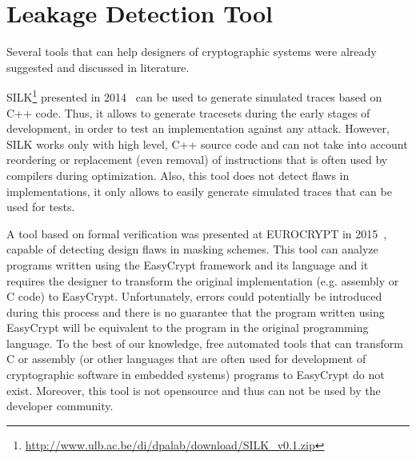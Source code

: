 \section{Leakage Detection Tool}\label{sec:tool}


Several tools that can help designers of cryptographic systems
were already suggested and discussed in literature.

SILK\footnote{\url{http://www.ulb.ac.be/di/dpalab/download/SILK_v0.1.zip}} 
presented in 2014~\cite{DBLP:conf/acsac/Veshchikov14}
can be used to generate simulated traces based on C++ code. Thus, it allows
to generate tracesets during the early stages of development, in order to test an implementation
against any attack. However, SILK works only with high level, C++ source code and 
can not take into account reordering or replacement (even removal) 
of instructions that is often used by compilers during
optimization. Also, this tool does not detect flaws in implementations, 
it only allows to easily generate simulated traces that can be used for tests.

A tool based on formal verification 
was presented at EUROCRYPT in 2015~\cite{DBLP:conf/eurocrypt/BartheBDFGS15},
capable of detecting design flaws in masking schemes.
This tool can analyze programs written using the EasyCrypt framework and its language and
it requires the designer to transform the original implementation (e.g. assembly or C code)
to EasyCrypt. Unfortunately, errors could potentially be introduced during this process
and there is no guarantee that the program written using EasyCrypt will be equivalent
to the program in the original programming language. To the best of our knowledge, 
free automated tools that can transform C or assembly 
(or other languages that are often used for development of cryptographic software in embedded systems) 
programs to EasyCrypt do not exist.
Moreover, this tool is not opensource and thus can not be used by the developer community.


